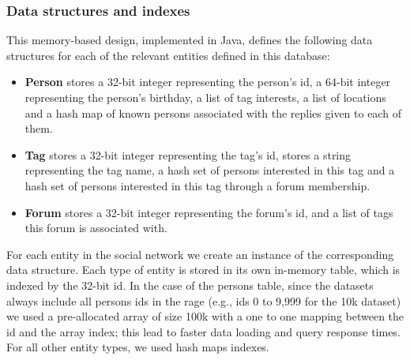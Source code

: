 \documentclass{article}
\begin{document}





\subsubsection{Data structures and indexes}
This memory-based design, implemented in Java, defines the following data structures for each 
of the relevant entities defined in this database: 
\begin{itemize}
\item \textbf{Person} stores a 32-bit integer representing the person's id, a 64-bit integer representing the person's birthday, a list of tag interests, a list of locations and a hash map of known persons associated with the replies given to each of them.
\item \textbf{Tag} stores a 32-bit integer representing the tag's id, stores a string representing the tag name, a hash set of persons interested in this tag and a hash set of persons interested in this tag through a forum membership. 
\item \textbf{Forum} stores a 32-bit integer representing the forum's id, and a list of tags this forum is associated with.
\end{itemize}

For each entity in the social network we create an instance of the corresponding data structure. Each type of entity is stored in its own in-memory table, which is indexed by the 32-bit id. In the case of the persons table, since the datasets always include all persons ids in the rage (e.g., ids 0 to 9,999 for the 10k dataset) we used a pre-allocated array of size 100k with a one to one mapping between the id and the array index; this lead to faster data loading and query response times. For all other entity types, we used hash maps indexes. 
\end{document}

